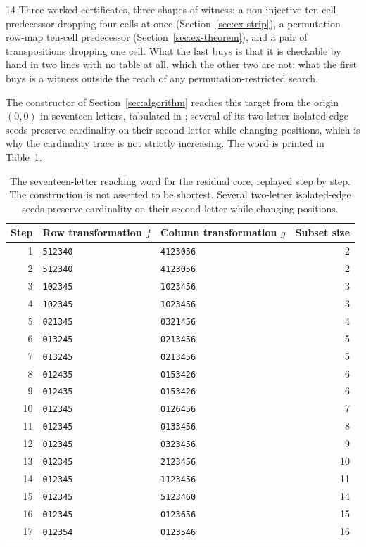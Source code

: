 \documentclass[11pt,letterpaper]{article}
\numberwithin{equation}{section}
\theoremstyle{definition}
\theoremstyle{remark}
\newcommand{\code}[1]{\texttt{\detokenize{#1}}}
\begin{document}
\begin{variantbox}{14}
Three worked certificates, three shapes of witness: a non-injective
ten-cell predecessor dropping four cells at once
(Section~\ref{sec:ex-strip}), a permutation-row-map ten-cell predecessor
(Section~\ref{sec:ex-theorem}), and a pair of transpositions dropping one
cell. What the last buys is that it is checkable by hand in two lines with no
table at all, which the other two are not; what the first buys is a witness
outside the reach of any permutation-restricted search.
\end{variantbox}

The constructor of Section~\ref{sec:algorithm} reaches this target from the
origin $(0,0)$ in seventeen letters, tabulated in
\code{residual/example\_6x7.json}; several of its two-letter isolated-edge
seeds preserve cardinality on their second letter while changing positions,
which is why the cardinality trace is not strictly increasing. The word is printed in
Table~\ref{tab:word}.

\begin{table}[htbp]
\centering
\begin{tabular}{rllr}
\toprule
Step & Row transformation $f$ & Column transformation $g$ & Subset size\\
\midrule
1 & \texttt{512340} & \texttt{4123056} & 2\\
2 & \texttt{512340} & \texttt{4123056} & 2\\
3 & \texttt{102345} & \texttt{1023456} & 3\\
4 & \texttt{102345} & \texttt{1023456} & 3\\
5 & \texttt{021345} & \texttt{0321456} & 4\\
6 & \texttt{013245} & \texttt{0213456} & 5\\
7 & \texttt{013245} & \texttt{0213456} & 5\\
8 & \texttt{012435} & \texttt{0153426} & 6\\
9 & \texttt{012435} & \texttt{0153426} & 6\\
10 & \texttt{012345} & \texttt{0126456} & 7\\
11 & \texttt{012345} & \texttt{0133456} & 8\\
12 & \texttt{012345} & \texttt{0323456} & 9\\
13 & \texttt{012345} & \texttt{2123456} & 10\\
14 & \texttt{012345} & \texttt{1123456} & 11\\
15 & \texttt{012345} & \texttt{5123460} & 14\\
16 & \texttt{012345} & \texttt{0123656} & 15\\
17 & \texttt{012354} & \texttt{0123546} & 16\\
\bottomrule
\end{tabular}
\caption{The seventeen-letter reaching word for the residual core, replayed
step by step. The construction is not asserted to be shortest. Several
two-letter isolated-edge seeds preserve cardinality on their second letter
while changing positions.}
\label{tab:word}
\end{table}
\end{document}
